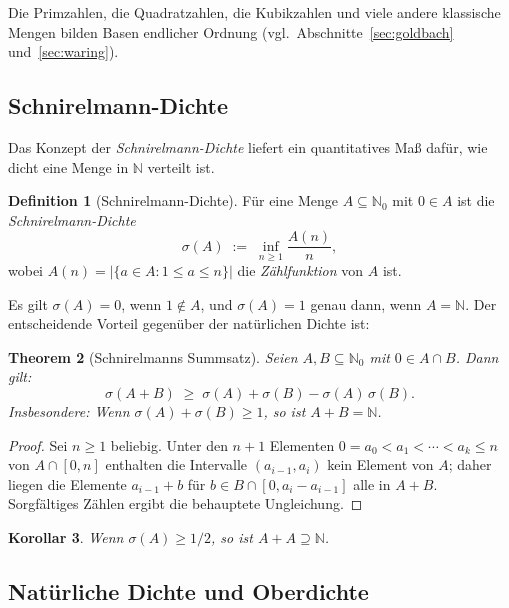 \documentclass[12pt,a4paper]{amsart}
\newtheorem{theorem}{Theorem}[section]
\newtheorem{korollar}[theorem]{Korollar}
\theoremstyle{definition}
\newtheorem{definition}[theorem]{Definition}
\newcommand{\N}{\mathbb{N}}
\newcommand{\abs}[1]{\left|#1\right|}
\begin{document}
Die Primzahlen, die Quadratzahlen, die Kubikzahlen und viele andere
klassische Mengen bilden Basen endlicher Ordnung
(vgl.\ Abschnitte~\ref{sec:goldbach} und~\ref{sec:waring}).

\subsection{Schnirelmann-Dichte}

Das Konzept der \emph{Schnirelmann-Dichte} liefert ein quantitatives
Ma\ss{} daf\"{u}r, wie dicht eine Menge in $\N$ verteilt ist.

\begin{definition}[Schnirelmann-Dichte]\label{def:schnirelmann-dichte}
F\"{u}r eine Menge $A \subseteq \N_0$ mit $0 \in A$ ist die
\emph{Schnirelmann-Dichte}
\[
  \sigma(A) \;:=\; \inf_{n \geq 1} \frac{A(n)}{n},
\]
wobei $A(n) = \abs{\{a \in A : 1 \leq a \leq n\}}$ die
\emph{Z\"{a}hlfunktion} von $A$ ist.
\end{definition}

Es gilt $\sigma(A) = 0$, wenn $1 \notin A$, und $\sigma(A) = 1$ genau
dann, wenn $A = \N$.  Der entscheidende Vorteil gegen\"{u}ber der
nat\"{u}rlichen Dichte ist:

\begin{theorem}[Schnirelmanns Summsatz]\label{thm:schnirelmann-summ}
Seien $A, B \subseteq \N_0$ mit $0 \in A \cap B$.  Dann gilt:
\[
  \sigma(A + B) \;\geq\; \sigma(A) + \sigma(B) - \sigma(A)\,\sigma(B).
\]
Insbesondere: Wenn $\sigma(A) + \sigma(B) \geq 1$, so ist $A + B = \N$.
\end{theorem}

\begin{proof}
Sei $n \geq 1$ beliebig.  Unter den $n + 1$ Elementen
$0 = a_0 < a_1 < \cdots < a_k \leq n$ von $A \cap [0,n]$ enthalten die
Intervalle $(a_{i-1}, a_i)$ kein Element von $A$; daher liegen die
Elemente $a_{i-1} + b$ f\"{u}r $b \in B \cap [0, a_i - a_{i-1}]$ alle
in $A + B$.  Sorgf\"{a}ltiges Z\"{a}hlen ergibt die behauptete Ungleichung.
\end{proof}

\begin{korollar}\label{kor:dichte-eins}
Wenn $\sigma(A) \geq 1/2$, so ist $A + A \supseteq \N$.
\end{korollar}

\subsection{Nat\"{u}rliche Dichte und Oberdichte}
\end{document}
